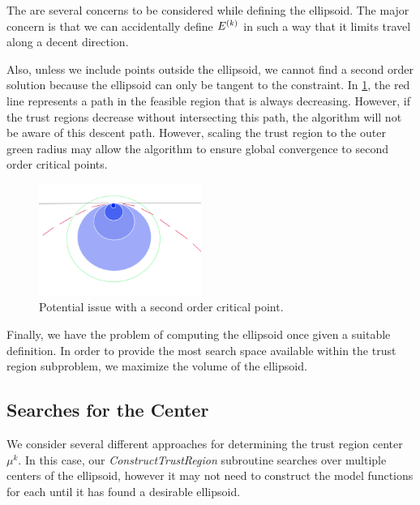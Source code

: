 The are several concerns to be considered while defining the ellipsoid.
The major concern is that we can accidentally define ${E^{(k)}}$ in such a way that it limits travel along a decent direction.


Also, unless we include points outside the ellipsoid, we cannot find a second order solution because the ellipsoid can only be tangent to the constraint.
In \cref{fbns}, the red line represents a path in the feasible region that is always decreasing.
However, if the trust regions decrease without intersecting this path, the algorithm will not be aware of this descent path.
However, scaling the trust region to the outer green radius may allow the algorithm to ensure global convergence to second order critical points.

\begin{figure}[h]
    \centering
    \includegraphics[width=200px]{images/second_order_critical_point.png}
    \caption{Potential issue with a second order critical point.}
    \label{fbns}
\end{figure}



Finally, we have the problem of computing the ellipsoid once given a suitable definition.
In order to provide the most search space available within the trust region subproblem, we maximize the volume of the ellipsoid.

\subsection{Searches for the Center}

We consider several different approaches for determining the trust region center $\mu^k$.
In this case, our \emph{ConstructTrustRegion} subroutine searches over multiple centers of the ellipsoid, however it may not need to construct the model functions for each until it has found a desirable ellipsoid.





